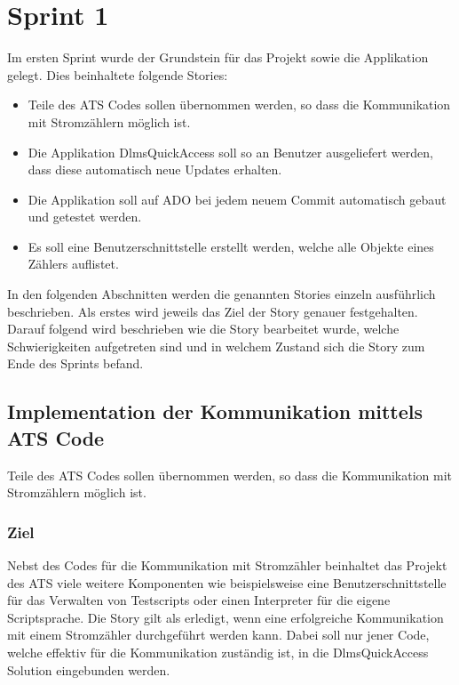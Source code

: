 \section{Sprint 1}
Im ersten Sprint wurde der Grundstein für das Projekt sowie die Applikation gelegt.
Dies beinhaltete folgende Stories:
\begin{itemize}
   \item Teile des \ac{ATS} Codes sollen übernommen werden, so dass die Kommunikation mit Stromzählern möglich ist.
   \item Die Applikation DlmsQuickAccess soll so an Benutzer ausgeliefert werden, dass diese automatisch neue Updates erhalten.
   \item Die Applikation soll auf \ac{ADO} bei jedem neuem Commit automatisch gebaut und getestet werden. 
   \item Es soll eine Benutzerschnittstelle erstellt werden, welche alle Objekte eines Zählers auflistet.
\end{itemize}
In den folgenden Abschnitten werden die genannten Stories einzeln ausführlich beschrieben.
Als erstes wird jeweils das Ziel der Story genauer festgehalten.
Darauf folgend wird beschrieben wie die Story bearbeitet wurde, welche Schwierigkeiten aufgetreten sind und in welchem Zustand sich die Story zum Ende des Sprints befand.

\subsection{Implementation der Kommunikation mittels ATS Code}\label{s1:ats}
\dq Teile des \ac{ATS} Codes sollen übernommen werden, so dass die Kommunikation mit Stromzählern möglich ist.\dq

\subsubsection{Ziel}
Nebst des Codes für die Kommunikation mit Stromzähler beinhaltet das Projekt des \ac{ATS} viele weitere Komponenten wie beispielsweise eine Benutzerschnittstelle für das Verwalten von Testscripts oder einen Interpreter für die eigene Scriptsprache.
Die Story gilt als erledigt, wenn eine erfolgreiche Kommunikation mit einem Stromzähler durchgeführt werden kann.
Dabei soll nur jener Code, welche effektiv für die Kommunikation zuständig ist, in die DlmsQuickAccess Solution eingebunden werden. 



